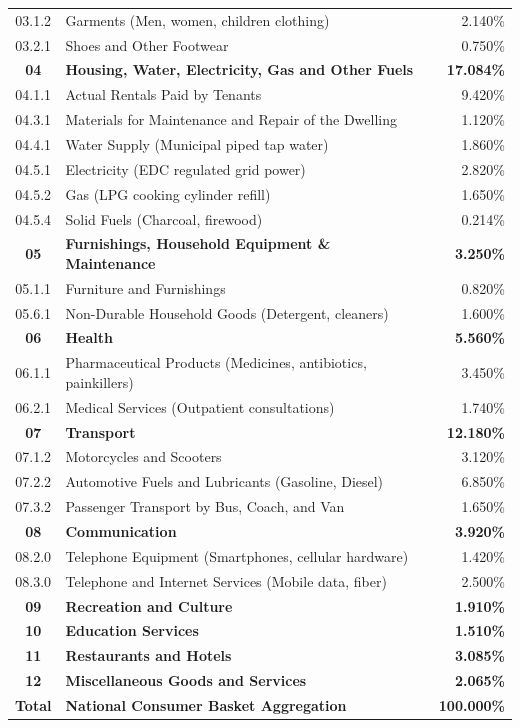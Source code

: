 \documentclass[11pt,a4paper]{article}
\begin{document}
\begin{longtable}{cp{8.5cm}r}
03.1.2 & Garments (Men, women, children clothing) & 2.140\% \\
03.2.1 & Shoes and Other Footwear & 0.750\% \\
\midrule
\textbf{04} & \textbf{Housing, Water, Electricity, Gas and Other Fuels} & \textbf{17.084\%} \\
04.1.1 & Actual Rentals Paid by Tenants & 9.420\% \\
04.3.1 & Materials for Maintenance and Repair of the Dwelling & 1.120\% \\
04.4.1 & Water Supply (Municipal piped tap water) & 1.860\% \\
04.5.1 & Electricity (EDC regulated grid power) & 2.820\% \\
04.5.2 & Gas (LPG cooking cylinder refill) & 1.650\% \\
04.5.4 & Solid Fuels (Charcoal, firewood) & 0.214\% \\
\midrule
\textbf{05} & \textbf{Furnishings, Household Equipment \& Maintenance} & \textbf{3.250\%} \\
05.1.1 & Furniture and Furnishings & 0.820\% \\
05.6.1 & Non-Durable Household Goods (Detergent, cleaners) & 1.600\% \\
\midrule
\textbf{06} & \textbf{Health} & \textbf{5.560\%} \\
06.1.1 & Pharmaceutical Products (Medicines, antibiotics, painkillers) & 3.450\% \\
06.2.1 & Medical Services (Outpatient consultations) & 1.740\% \\
\midrule
\textbf{07} & \textbf{Transport} & \textbf{12.180\%} \\
07.1.2 & Motorcycles and Scooters & 3.120\% \\
07.2.2 & Automotive Fuels and Lubricants (Gasoline, Diesel) & 6.850\% \\
07.3.2 & Passenger Transport by Bus, Coach, and Van & 1.650\% \\
\midrule
\textbf{08} & \textbf{Communication} & \textbf{3.920\%} \\
08.2.0 & Telephone Equipment (Smartphones, cellular hardware) & 1.420\% \\
08.3.0 & Telephone and Internet Services (Mobile data, fiber) & 2.500\% \\
\midrule
\textbf{09} & \textbf{Recreation and Culture} & \textbf{1.910\%} \\
\textbf{10} & \textbf{Education Services} & \textbf{1.510\%} \\
\textbf{11} & \textbf{Restaurants and Hotels} & \textbf{3.085\%} \\
\textbf{12} & \textbf{Miscellaneous Goods and Services} & \textbf{2.065\%} \\
\midrule
\textbf{Total} & \textbf{National Consumer Basket Aggregation} & \textbf{100.000\%} \\
\bottomrule
\end{longtable}
\end{document}
